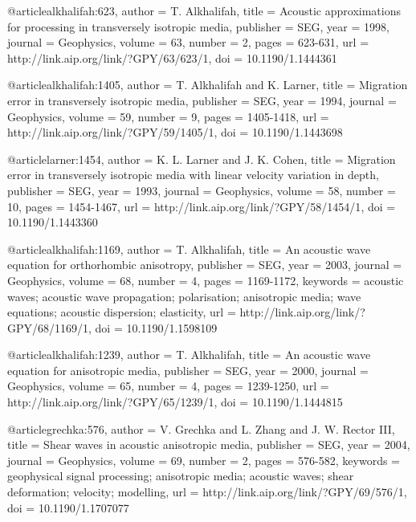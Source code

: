 {@article{alkhalifah:623,
  author =	 {T. Alkhalifah},
  title =	 {Acoustic approximations for processing in
                  transversely isotropic media},
  publisher =	 {SEG},
  year =	 1998,
  journal =	 {Geophysics},
  volume =	 63,
  number =	 2,
  pages =	 {623-631},
  url =		 {http://link.aip.org/link/?GPY/63/623/1},
  doi =		 {10.1190/1.1444361}
}

@article{alkhalifah:1405,
  author =	 {T. Alkhalifah and K. Larner},
  title =	 {Migration error in transversely isotropic media},
  publisher =	 {SEG},
  year =	 1994,
  journal =	 {Geophysics},
  volume =	 59,
  number =	 9,
  pages =	 {1405-1418},
  url =		 {http://link.aip.org/link/?GPY/59/1405/1},
  doi =		 {10.1190/1.1443698}
}

@article{larner:1454,
  author =	 {K. L. Larner and J. K. Cohen},
  title =	 {Migration error in transversely isotropic media with
                  linear velocity variation in depth},
  publisher =	 {SEG},
  year =	 1993,
  journal =	 {Geophysics},
  volume =	 58,
  number =	 10,
  pages =	 {1454-1467},
  url =		 {http://link.aip.org/link/?GPY/58/1454/1},
  doi =		 {10.1190/1.1443360}
}

@article{alkhalifah:1169,
  author =	 {T. Alkhalifah},
  title =	 {An acoustic wave equation for orthorhombic
                  anisotropy},
  publisher =	 {SEG},
  year =	 2003,
  journal =	 {Geophysics},
  volume =	 68,
  number =	 4,
  pages =	 {1169-1172},
  keywords =	 {acoustic waves; acoustic wave propagation;
                  polarisation; anisotropic media; wave equations;
                  acoustic dispersion; elasticity},
  url =		 {http://link.aip.org/link/?GPY/68/1169/1},
  doi =		 {10.1190/1.1598109}
}

@article{alkhalifah:1239,
  author =	 {T. Alkhalifah},
  title =	 {An acoustic wave equation for anisotropic media},
  publisher =	 {SEG},
  year =	 2000,
  journal =	 {Geophysics},
  volume =	 65,
  number =	 4,
  pages =	 {1239-1250},
  url =		 {http://link.aip.org/link/?GPY/65/1239/1},
  doi =		 {10.1190/1.1444815}
}

@article{grechka:576,
  author =	 {V. Grechka and L. Zhang and J.
                  W. Rector III},
  title =	 {Shear waves in acoustic anisotropic media},
  publisher =	 {SEG},
  year =	 2004,
  journal =	 {Geophysics},
  volume =	 69,
  number =	 2,
  pages =	 {576-582},
  keywords =	 {geophysical signal processing; anisotropic media;
                  acoustic waves; shear deformation; velocity;
                  modelling},
  url =		 {http://link.aip.org/link/?GPY/69/576/1},
  doi =		 {10.1190/1.1707077}
}

}

